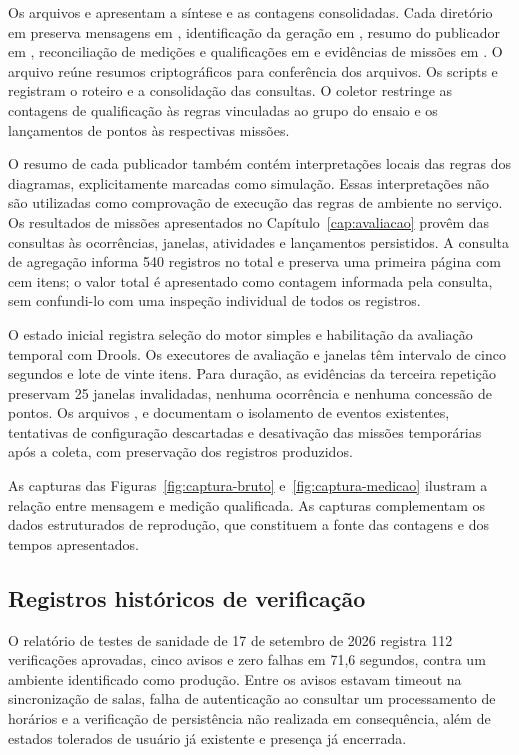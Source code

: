 \documentclass[tcc,capa]{texufpel}
\begin{document}
Os arquivos  e  apresentam a síntese e as contagens consolidadas. Cada diretório em  preserva mensagens em , identificação da geração em , resumo do publicador em , reconciliação de medições e qualificações em  e evidências de missões em . O arquivo  reúne resumos criptográficos para conferência dos arquivos. Os scripts  e  registram o roteiro e a consolidação das consultas. O coletor restringe as contagens de qualificação às regras vinculadas ao grupo do ensaio e os lançamentos de pontos às respectivas missões.

O resumo de cada publicador também contém interpretações locais das regras dos diagramas, explicitamente marcadas como simulação. Essas interpretações não são utilizadas como comprovação de execução das regras de ambiente no serviço. Os resultados de missões apresentados no Capítulo~\ref{cap:avaliacao} provêm das consultas às ocorrências, janelas, atividades e lançamentos persistidos. A consulta de agregação informa 540 registros no total e preserva uma primeira página com cem itens; o valor total é apresentado como contagem informada pela consulta, sem confundi-lo com uma inspeção individual de todos os registros.

O estado inicial registra seleção do motor simples e habilitação da avaliação temporal com Drools. Os executores de avaliação e janelas têm intervalo de cinco segundos e lote de vinte itens. Para duração, as evidências da terceira repetição preservam 25 janelas invalidadas, nenhuma ocorrência e nenhuma concessão de pontos. Os arquivos ,  e  documentam o isolamento de eventos existentes, tentativas de configuração descartadas e desativação das missões temporárias após a coleta, com preservação dos registros produzidos.

As capturas das Figuras~\ref{fig:captura-bruto} e~\ref{fig:captura-medicao} ilustram a relação entre mensagem e medição qualificada. As capturas complementam os dados estruturados de reprodução, que constituem a fonte das contagens e dos tempos apresentados.

\subsection{Registros históricos de verificação}
O relatório de testes de sanidade de 17 de setembro de 2026 \cite{probenSmoke2026} registra 112 verificações aprovadas, cinco avisos e zero falhas em 71,6 segundos, contra um ambiente identificado como produção. Entre os avisos estavam timeout na sincronização de salas, falha de autenticação ao consultar um processamento de horários e a verificação de persistência não realizada em consequência, além de estados tolerados de usuário já existente e presença já encerrada.
\end{document}
